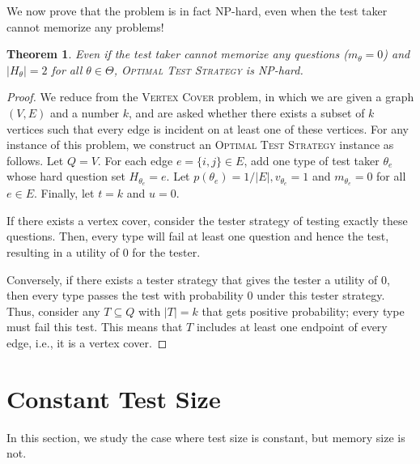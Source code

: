 \documentclass{article}
\newtheorem{theorem}{Theorem}
\begin{document}
We now prove that the problem is in fact NP-hard, even when the test taker
cannot memorize any problems!

\begin{theorem}\label{thm:test-hardness}
Even if the test taker cannot memorize any questions ($m_\theta = 0$) and $|H_\theta| = 2$ for all
$\theta \in \Theta$,
\textsc{Optimal
Test Strategy} is NP-hard.%
\end{theorem}
\begin{proof}
We reduce from the 
\textsc{Vertex Cover} problem, in which we are given a graph $(V,E)$ and a
number $k$, and are asked whether there exists a subset of $k$ vertices such
that every edge is incident on at least one of these vertices.
For any instance of this problem, we construct an \textsc{Optimal Test
	Strategy} instance as follows.
      Let $Q=V$.  For each edge $e = \{i, j\} \in E$, add one type of test
      taker $\theta_e$ whose hard question set $H_{\theta_e} = e$.  Let
      $p(\theta_e) = 1/|E|, v_{\theta_e} = 1$ and $m_{\theta_e} = 0$ for
      all $e \in E$.  Finally, let $t=k$ and $u = 0$.

If there exists a vertex cover, consider the tester strategy of testing
exactly these questions.  Then, every type will fail at least one question
and hence the test, resulting
in a utility of $0$ for the tester.

Conversely, if there exists a tester strategy that gives the tester a
utility of $0$, then every type passes the test with probability $0$ under
this tester strategy.  Thus, consider any $T \subseteq Q$ with $|T| = k$ that
gets positive probability; every type must fail this test.  This means that
$T$ includes at least one endpoint of every edge, i.e., it is a vertex cover.
\end{proof}

\section{Constant Test Size}

In this section, we study the case where test size is constant, but memory
size is not.
\end{document}
